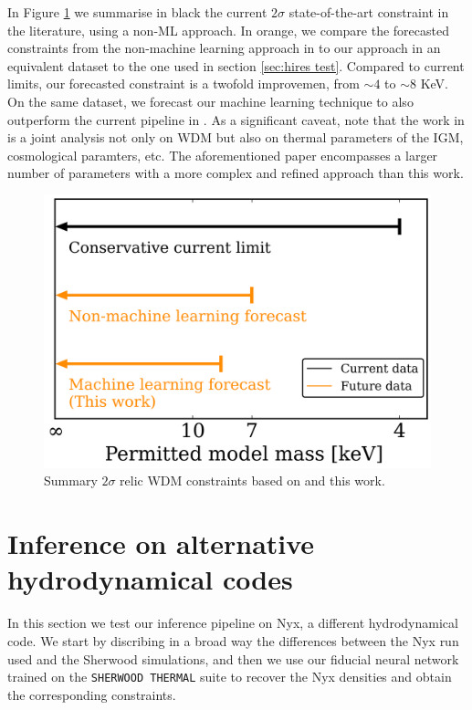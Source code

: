 In Figure \ref{fig: wdm constraints summary} we summarise in black the current $2\sigma$ state-of-the-art constraint in the literature, using a non-ML approach. In orange, we compare the forecasted constraints from the non-machine learning approach in \cite{sherwood_wdm} to our approach in an equivalent dataset to the one used in section \ref{sec:hires test}. Compared to current limits, our forecasted constraint is a twofold improvemen, from $\sim 4$ to $\sim 8$ KeV. On the same dataset, we forecast our machine learning technique to also outperform the current pipeline in \cite{sherwood_wdm}. As a significant caveat, note that the work in \cite{sherwood_wdm} is a joint analysis not only on WDM but also on thermal parameters of the IGM, cosmological paramters, etc. The aforementioned paper encompasses a larger number of parameters with a more complex and refined approach than this work.


\begin{figure}
    \centering
    \includegraphics[width=0.6\linewidth]{img/ML/limits_summary.png}
    \caption{Summary $2\sigma$ relic WDM constraints based on \cite{sherwood_wdm} and this work.}
    \label{fig: wdm constraints summary}
\end{figure}













\section{Inference on alternative hydrodynamical codes}
In this section we test our inference pipeline on Nyx, a different hydrodynamical code. We start by discribing in a broad way the differences between the Nyx run used and the Sherwood simulations, and then we use our fiducial neural network trained on the \texttt{SHERWOOD THERMAL} suite to recover the Nyx densities and obtain the corresponding constraints.



